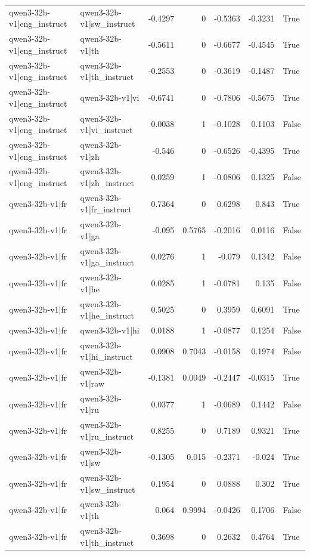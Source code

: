 \begin{table}
\begin{tabular}{l l r r r r l}
qwen3-32b-v1|eng_instruct & qwen3-32b-v1|sw_instruct & -0.4297 & 0 & -0.5363 & -0.3231 & True \\
qwen3-32b-v1|eng_instruct & qwen3-32b-v1|th & -0.5611 & 0 & -0.6677 & -0.4545 & True \\
qwen3-32b-v1|eng_instruct & qwen3-32b-v1|th_instruct & -0.2553 & 0 & -0.3619 & -0.1487 & True \\
qwen3-32b-v1|eng_instruct & qwen3-32b-v1|vi & -0.6741 & 0 & -0.7806 & -0.5675 & True \\
qwen3-32b-v1|eng_instruct & qwen3-32b-v1|vi_instruct & 0.0038 & 1 & -0.1028 & 0.1103 & False \\
qwen3-32b-v1|eng_instruct & qwen3-32b-v1|zh & -0.546 & 0 & -0.6526 & -0.4395 & True \\
qwen3-32b-v1|eng_instruct & qwen3-32b-v1|zh_instruct & 0.0259 & 1 & -0.0806 & 0.1325 & False \\
qwen3-32b-v1|fr & qwen3-32b-v1|fr_instruct & 0.7364 & 0 & 0.6298 & 0.843 & True \\
qwen3-32b-v1|fr & qwen3-32b-v1|ga & -0.095 & 0.5765 & -0.2016 & 0.0116 & False \\
qwen3-32b-v1|fr & qwen3-32b-v1|ga_instruct & 0.0276 & 1 & -0.079 & 0.1342 & False \\
qwen3-32b-v1|fr & qwen3-32b-v1|he & 0.0285 & 1 & -0.0781 & 0.135 & False \\
qwen3-32b-v1|fr & qwen3-32b-v1|he_instruct & 0.5025 & 0 & 0.3959 & 0.6091 & True \\
qwen3-32b-v1|fr & qwen3-32b-v1|hi & 0.0188 & 1 & -0.0877 & 0.1254 & False \\
qwen3-32b-v1|fr & qwen3-32b-v1|hi_instruct & 0.0908 & 0.7043 & -0.0158 & 0.1974 & False \\
qwen3-32b-v1|fr & qwen3-32b-v1|raw & -0.1381 & 0.0049 & -0.2447 & -0.0315 & True \\
qwen3-32b-v1|fr & qwen3-32b-v1|ru & 0.0377 & 1 & -0.0689 & 0.1442 & False \\
qwen3-32b-v1|fr & qwen3-32b-v1|ru_instruct & 0.8255 & 0 & 0.7189 & 0.9321 & True \\
qwen3-32b-v1|fr & qwen3-32b-v1|sw & -0.1305 & 0.015 & -0.2371 & -0.024 & True \\
qwen3-32b-v1|fr & qwen3-32b-v1|sw_instruct & 0.1954 & 0 & 0.0888 & 0.302 & True \\
qwen3-32b-v1|fr & qwen3-32b-v1|th & 0.064 & 0.9994 & -0.0426 & 0.1706 & False \\
qwen3-32b-v1|fr & qwen3-32b-v1|th_instruct & 0.3698 & 0 & 0.2632 & 0.4764 & True \\

\end{tabular}
\end{table}
